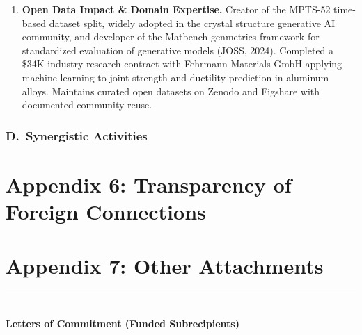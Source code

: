 \documentclass[11pt,letterpaper]{article}
\begin{document}
\begin{enumerate}
\item \textbf{Open Data Impact \& Domain Expertise.}
Creator of the MPTS-52 time-based dataset split, widely adopted in the
crystal structure generative AI community, and developer of the
Matbench-genmetrics framework for standardized evaluation of generative
models (JOSS, 2024). Completed a \$34K industry research contract with
Fehrmann Materials GmbH applying machine learning to joint strength and
ductility prediction in aluminum alloys. Maintains curated open datasets on
Zenodo and Figshare with documented community reuse.

\end{enumerate}


\subsubsection*{D.\ Synergistic Activities}


\newpage
\section*{Appendix 6: Transparency of Foreign Connections}
\label{app:foreign}





\section*{Appendix 7: Other Attachments}
\label{app:other}

\bigskip
\noindent\rule{\textwidth}{0.4pt}\\
\textbf{Letters of Commitment (Funded Subrecipients)}
\end{document}
